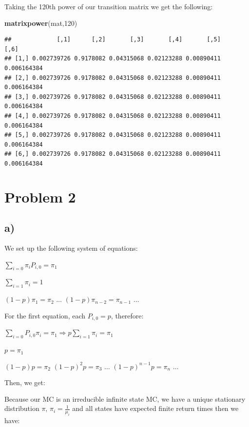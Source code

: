 \documentclass[]{article}
\newenvironment{Shaded}{\begin{snugshade}}{\end{snugshade}}
\newcommand{\DecValTok}[1]{\textcolor[rgb]{0.00,0.00,0.81}{#1}}
\newcommand{\KeywordTok}[1]{\textcolor[rgb]{0.13,0.29,0.53}{\textbf{#1}}}
\newcommand{\NormalTok}[1]{#1}
\begin{document}
Taking the 120th power of our transition matrix we get the following:

\begin{Shaded}
\begin{Highlighting}[]
\KeywordTok{matrixpower}\NormalTok{(mat,}\DecValTok{120}\NormalTok{)}
\end{Highlighting}
\end{Shaded}

\begin{verbatim}
##             [,1]      [,2]       [,3]       [,4]       [,5]        [,6]
## [1,] 0.002739726 0.9178082 0.04315068 0.02123288 0.00890411 0.006164384
## [2,] 0.002739726 0.9178082 0.04315068 0.02123288 0.00890411 0.006164384
## [3,] 0.002739726 0.9178082 0.04315068 0.02123288 0.00890411 0.006164384
## [4,] 0.002739726 0.9178082 0.04315068 0.02123288 0.00890411 0.006164384
## [5,] 0.002739726 0.9178082 0.04315068 0.02123288 0.00890411 0.006164384
## [6,] 0.002739726 0.9178082 0.04315068 0.02123288 0.00890411 0.006164384
\end{verbatim}

\newpage

\hypertarget{problem-2}{%
\section{Problem 2}\label{problem-2}}

\hypertarget{a-1}{%
\subsection{a)}\label{a-1}}

We set up the following system of equations:

\(\sum_{i=0} \pi_{i} P_{i,0} = \pi_{1}\)

\(\sum_{i=1} \pi_{i} = 1\)

\((1 - p) \pi_{1} = \pi_{2}\) \(\dots\)
\((1 - p) \pi_{n-2} = \pi_{n-1}\) \(\dots\)

For the first equation, each \(P_{i,0} = p\), therefore:

\(\sum_{i=0} P_{i,0} \pi_{i} = \pi_{1} \Rightarrow p \sum_{i=1} \pi_{i} = \pi_{1}\)

\(p = \pi_{1}\)

\((1 - p)p = \pi_{2}\) \((1 - p)^{2} p = \pi_{3}\) \(\dots\)
\((1 - p)^{n-1} p = \pi_{n}\) \(\dots\)

Then, we get:

Because our MC is an irreducible infinite state MC, we have a unique
stationary distribution \(\pi\), \(\pi_{i} = \frac{1}{\mu_{i}}\) and all
states have expected finite return times then we have:
\end{document}
